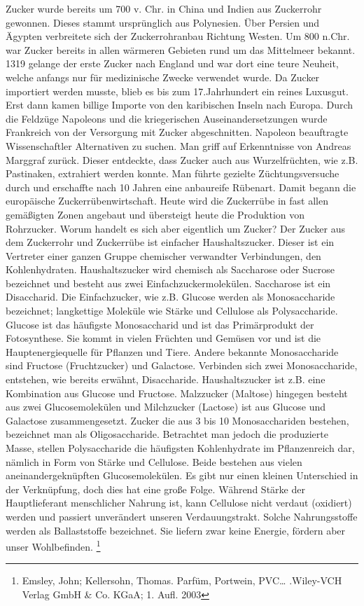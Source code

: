 \documentclass{scrartcl}  %
\begin{document}
\begin{tcolorbox}
				Zucker wurde bereits um 700 v. Chr. in China und Indien aus Zuckerrohr gewonnen. Dieses stammt ursprünglich aus Polynesien. Über Persien und Ägypten verbreitete sich der Zuckerrohranbau Richtung Westen. Um 800 n.Chr. war Zucker bereits in allen wärmeren Gebieten rund um das Mittelmeer bekannt. 1319 gelange der erste Zucker nach England und war dort eine teure Neuheit, welche anfangs nur für medizinische Zwecke verwendet wurde. \newline
				Da Zucker importiert werden musste, blieb es bis zum 17.Jahrhundert ein reines Luxusgut. Erst dann kamen billige Importe von den karibischen Inseln nach Europa. Durch die Feldzüge Napoleons und die kriegerischen Auseinandersetzungen  wurde Frankreich von der Versorgung mit Zucker abgeschnitten. Napoleon beauftragte Wissenschaftler Alternativen zu suchen. Man griff auf Erkenntnisse von Andreas Marggraf zurück. Dieser entdeckte, dass Zucker auch aus Wurzelfrüchten, wie z.B. Pastinaken, extrahiert werden konnte. Man führte gezielte Züchtungsversuche durch und erschaffte nach 10 Jahren eine anbaureife Rübenart. Damit begann die europäische Zuckerrübenwirtschaft. Heute wird die Zuckerrübe in fast allen gemäßigten Zonen angebaut und übersteigt heute die Produktion von Rohrzucker.  \newline				
				Worum handelt es sich aber eigentlich um Zucker? Der Zucker aus dem Zuckerrohr und Zuckerrübe ist einfacher Haushaltszucker. Dieser ist ein Vertreter einer ganzen Gruppe chemischer verwandter Verbindungen, den Kohlenhydraten. Haushaltszucker wird chemisch als Saccharose oder Sucrose bezeichnet und besteht aus zwei Einfachzuckermolekülen. Saccharose ist ein Disaccharid.
				Die Einfachzucker, wie z.B. Glucose werden als Monosaccharide bezeichnet; langkettige Moleküle wie Stärke und Cellulose als Polysaccharide. Glucose ist das häufigste Monosaccharid und ist das Primärprodukt der Fotosynthese. Sie kommt in vielen Früchten und Gemüsen vor und ist die Hauptenergiequelle für Pflanzen und Tiere. Andere bekannte Monosaccharide sind Fructose (Fruchtzucker) und Galactose.  \newline
				Verbinden sich zwei Monosaccharide, entstehen, wie bereits erwähnt, Disaccharide. 
				Haushaltszucker ist z.B. eine Kombination aus Glucose und Fructose. Malzzucker (Maltose) hingegen besteht aus zwei Glucosemolekülen und Milchzucker (Lactose) ist aus Glucose und Galactose zusammengesetzt.  \newline
				Zucker die aus 3 bis 10 Monosacchariden bestehen, bezeichnet man als Oligosaccharide.
				Betrachtet man jedoch die produzierte Masse, stellen Polysaccharide die häufigsten Kohlenhydrate im Pflanzenreich dar, nämlich in Form von Stärke und Cellulose. Beide bestehen aus vielen aneinandergeknüpften Glucosemolekülen. Es gibt nur einen kleinen Unterschied in der Verknüpfung, doch dies hat eine große Folge. Während Stärke der Hauptlieferant menschlicher Nahrung ist, kann Cellulose nicht verdaut (oxidiert) werden und passiert unverändert unseren Verdauungstrakt. Solche Nahrungsstoffe werden als Ballaststoffe bezeichnet. Sie liefern zwar keine Energie, fördern aber unser Wohlbefinden. \footnote{Emsley, John; Kellersohn, Thomas. Parfüm, Portwein, PVC… .Wiley-VCH Verlag GmbH \& Co. KGaA; 1. Aufl. 2003}

\end{tcolorbox}
\end{document}
